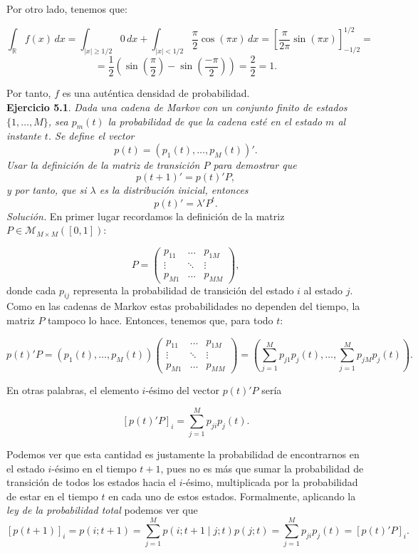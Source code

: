 \documentclass[11pt,a4paper]{article}
\begin{document}
Por otro lado, tenemos que:

\[
\int_{\mathbb{R}} f(x)\, dx = \int_{|x|\geq 1/2} 0\, dx + \int_{|x|<1/2} \frac{\pi}{2}\cos(\pi x)\, dx = \left[ \frac{\pi}{2\pi} \sin(\pi x)  \right]^{1/2}_{-1/2} =\]\[= \frac{1}{2}\left( \sin\left(\frac{\pi}{2}\right) - \sin\left(\frac{-\pi}{2}\right)\right) = \frac{2}{2} = 1.
\]
\vspace{.1em}

Por tanto, $f$ es una auténtica densidad de probabilidad.\\

\textbf{Ejercicio 5.1}. \textit{Dada una cadena de Markov con un conjunto finito de estados $\{1,\dots,M\}$, sea $p_m(t)$ la probabilidad de que la cadena esté en el estado $m$ al instante $t$. Se define el vector
\[
p(t)=(p_1(t),\dots, p_M(t))'.
\]
Usar la definición de la matriz de transición $P$ para demostrar que
\[
p(t+1)'= p(t)'P,
\]
y por tanto, que si $\lambda$ es la distribución inicial, entonces
\[
p(t)'=\lambda'P^t.
\]}
\textit{Solución.} En primer lugar recordamos la definición de la matriz $P \in \mathcal M_{M\times M}([0, 1])$:

\[
P=\begin{pmatrix}
  p_{11} & \dots & p_{1M}\\
  \vdots & \ddots & \vdots\\
  p_{M1} & \dots & p_{MM}
\end{pmatrix},
\]
donde cada $p_{ij}$ representa la probabilidad de transición del estado $i$ al estado $j$. Como en las cadenas de Markov estas probabilidades no dependen del tiempo, la matriz $P$ tampoco lo hace. Entonces, tenemos que, para todo $t$:

\[
p(t)'P = (p_1(t),\dots, p_M(t))\begin{pmatrix}
  p_{11} & \dots & p_{1M}\\
  \vdots & \ddots & \vdots\\
  p_{M1} & \dots & p_{MM}
\end{pmatrix} = \left( \sum_{j=1}^M p_{j1}p_j(t), \dots, \sum_{j=1}^M p_{jM}p_j(t) \right).
\]

En otras palabras, el elemento $i$-ésimo del vector $p(t)'P$ sería

$$[p(t)'P]_i = \sum_{j=1}^M p_{ji}p_j(t).$$

Podemos ver que esta cantidad es justamente la probabilidad de encontrarnos en el estado $i$-ésimo en el tiempo $t+1$, pues no es más que sumar la probabilidad de transición de todos los estados hacia el $i$-ésimo, multiplicada por la probabilidad de estar en el tiempo $t$ en cada uno de estos estados. Formalmente, aplicando la \textit{ley de la probabilidad total} podemos ver que
$$
[p(t+1)]_i = p(i;t+1) = \sum_{j=1}^M p(i; t+1 \mid j; t)p(j;t) = \sum_{j=1}^M p_{ji}p_j(t) = [p(t)'P]_i.
$$
\end{document}
